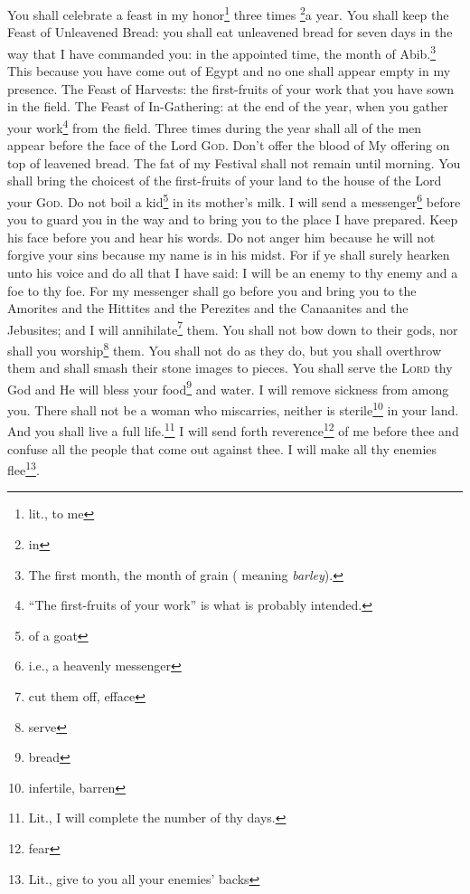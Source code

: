 \begin{enumerate}[align=center]
     You shall celebrate a feast in my honor\footnote{lit., to me} three times \footnote{in}a year.%
     You shall keep the Feast of Unleavened Bread: you shall eat unleavened bread for seven days in the way that I have commanded you: in the appointed time, the month of Abib.\footnote{The first month, the month of grain ( meaning \textit{barley}).} This because you have come out of Egypt and no one shall appear empty in my presence.%
     The Feast of Harvests: the first-fruits of your work that you have sown in the field. The Feast of In-Gathering: at the end of the year, when you gather your work\footnote{``The first-fruits of your work'' is what is probably intended.} from the field.%
     Three times during the year shall all of the men appear before the face of the Lord \textsc{God}.%
     Don't offer the blood of My offering on top of leavened bread. The fat of my Festival shall not remain until morning.%
     You shall bring the choicest of the first-fruits of your land to the house of the Lord your \textsc{God}. Do not boil a kid\footnote{of a goat} in its mother's milk.%
     I will send a messenger\footnote{i.e., a heavenly messenger} before you to guard you in the way and to bring you to the place I have prepared.%
     Keep his face before you and hear his words. Do not anger him because he will not forgive your sins because my name is in his midst.%
     For if ye shall surely hearken unto his voice and do all that I have said: I will be an enemy to thy enemy and a foe to thy foe.%
     For my messenger shall go before you and bring you to the Amorites and the Hittites and the Perezites and the Canaanites and the Jebusites; and I will annihilate\footnote{cut them off, efface} them.%
     You shall not bow down to their gods, nor shall you worship\footnote{serve} them. You shall not do as they do, but you shall overthrow them and shall smash their stone images to pieces.%
     You shall serve the \textsc{Lord} thy God and He will bless your food\footnote{bread} and water. I will remove sickness from among you.%
     There shall not be a woman who miscarries, neither is sterile\footnote{infertile, barren} in your land. And you shall live a full life.\footnote{Lit., I will complete the number of thy days.}%
     I will send forth reverence\footnote{fear} of me before thee and confuse all the people that come out against thee. I will make all thy enemies flee\footnote{Lit., give to you all your enemies' backs}.%

\end{enumerate}
